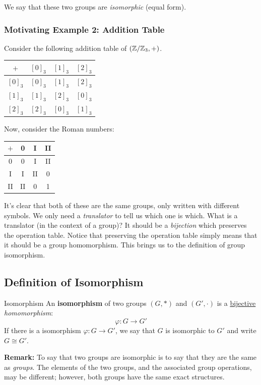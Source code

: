 \documentclass[letterpaper]{article}
\begin{document}
\bigskip 

We say that these two groups are \emph{isomorphic} (equal form). 

\subsubsection{Motivating Example 2: Addition Table}
Consider the following addition table of $(\mathbb{Z} / \mathbb{Z}_3, +)$.
\begin{center}
    \begin{tabular}{c|c c c}
        $+$     & $[0]_3$ & $[1]_3$ & $[2]_3$ \\ 
        \hline 
        $[0]_3$ & $[0]_3$ & $[1]_3$ & $[2]_3$ \\
        $[1]_3$ & $[1]_3$ & $[2]_3$ & $[0]_3$ \\
        $[2]_3$ & $[2]_3$ & $[0]_3$ & $[1]_3$ 
    \end{tabular}
\end{center}
Now, consider the Roman numbers: 
\begin{center}
    \begin{tabular}{c|c c c}
        $+$     & 0 & I & II \\ 
        \hline 
        0       & 0 & I & II \\ 
        I       & I & II & 0 \\ 
        II      & II & 0 & 1
    \end{tabular}
\end{center}
It's clear that both of these are the same groups, only written with different symbols. We only need a \emph{translator} to tell us which one is which. What is a translator (in the context of a group)? It should be a \emph{bijection} which preserves the operation table. Notice that preserving the operation table simply means that it should be a group homomorphism. This brings us to the definition of group isomorphism. 


\subsection{Definition of Isomorphism}
\begin{definition}{Isomorphism}{}
    An \textbf{isomorphism} of two groups $(G, *)$ and $(G', \cdot)$ is a \underline{bijective} \emph{homomorphism}: 
    \[\varphi: G \to G'\]
    If there is a isomorphism $\varphi: G \to G'$, we say that $G$ is isomorphic to $G'$ and write $G \cong G'$. 
\end{definition}
\textbf{Remark:} To say that two groups are isomorphic is to say that they are the same as \emph{groups}. The elements of the two groups, and the associated group operations, may be different; however, both groups have the same exact structures.
\end{document}
